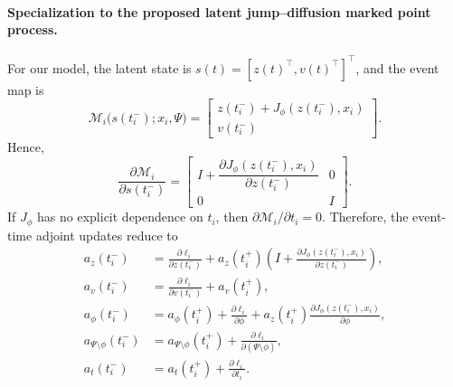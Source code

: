 \documentclass[11pt]{article}
\theoremstyle{definition}
\numberwithin{equation}{section}
\numberwithin{theorem}{section}
\numberwithin{proposition}{section}
\numberwithin{lemma}{section}
\numberwithin{corollary}{section}
\numberwithin{definition}{section}
\numberwithin{remark}{section}
\newcommand{\1}{\mathbbm{1}}
\begin{document}
\paragraph{Specialization to the proposed latent jump--diffusion marked point process.}
For our model, the latent state is $s(t)=[z(t)^\top,v(t)^\top]^\top$, and the event map is
\begin{equation}
\label{eq:event_map_specific}
\mathcal M_i\bigl(s(t_i^-);x_i,\Psi\bigr)
=
\begin{bmatrix}
z(t_i^-)+J_\phi(z(t_i^-),x_i)\\
v(t_i^-)
\end{bmatrix}.
\end{equation}
Hence,
\begin{equation}
\label{eq:event_map_jacobian_specific}
\frac{\partial \mathcal M_i}{\partial s(t_i^-)}
=
\begin{bmatrix}
I+\dfrac{\partial J_\phi(z(t_i^-),x_i)}{\partial z(t_i^-)} & 0\\[1.2ex]
0 & I
\end{bmatrix}.
\end{equation}
If $J_\phi$ has no explicit dependence on $t_i$, then $\partial \mathcal M_i/\partial t_i=0$. 
Therefore, the event-time adjoint updates reduce to
\begin{align}
\label{eq:adjoint_z_jump_specific}
a_z(t_i^-)
&=
\frac{\partial \ell_i}{\partial z(t_i^-)}
+
a_z(t_i^+)
\left(
I+\frac{\partial J_\phi(z(t_i^-),x_i)}{\partial z(t_i^-)}
\right),\\
\label{eq:adjoint_v_jump_specific}
a_v(t_i^-)
&=
\frac{\partial \ell_i}{\partial v(t_i^-)}
+
a_v(t_i^+),\\
\label{eq:adjoint_phi_jump_specific}
a_\phi(t_i^-)
&=
a_\phi(t_i^+)
+
\frac{\partial \ell_i}{\partial \phi}
+
a_z(t_i^+)\frac{\partial J_\phi(z(t_i^-),x_i)}{\partial \phi},\\
\label{eq:adjoint_other_jump_specific}
a_{\Psi\setminus\phi}(t_i^-)
&=
a_{\Psi\setminus\phi}(t_i^+)
+
\frac{\partial \ell_i}{\partial (\Psi\setminus\phi)},\\
\label{eq:adjoint_time_jump_specific}
a_t(t_i^-)
&=
a_t(t_i^+)
+
\frac{\partial \ell_i}{\partial t_i}.
\end{align}
\end{document}
